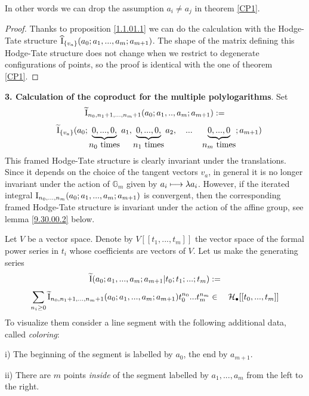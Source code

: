\documentclass[10pt]{article}
\begin{document}
In other words 
we can drop the assumption 
$a_i \not = a_j$ in theorem \ref{CP1}. 
  
\begin{proof}  Thanks to proposition \ref{1.1.01.1} we can do the calculation 
 with the Hodge-Tate structure $\widehat {\rm I}_{\{v_a\}}(a_0; a_1, ..., a_m; a_{m+1})$.
The shape of the matrix defining this Hodge-Tate structure 
does not change when we restrict to degenerate configurations of points, 
so the proof is identical with the one of theorem \ref{CP1}. 


\end{proof}

{\bf 3. Calculation of the coproduct for the multiple polylogarithms}. Set
\begin{equation}  \label{12.18.00.2}
\widetilde {\rm I}_{n_0, n_1+1, ..., n_m+1}(a_0; a_1, .., a_m; a_{m+1}):= 
\end{equation} 
$$
\quad \widetilde 
{\rm I}_{\{v_a\}}(a_0; \underbrace{0, ..., 0,}_{\mbox{$n_0$ times}} a_1, 
\underbrace{0, ..., 0,}_{\mbox{$n_1$ times}} a_2,\quad ...  \quad 
\underbrace{0, ..., 0}_{\mbox{$n_m$ times}}; a_{m+1})
 $$
This framed Hodge-Tate structure  is clearly invariant under the translations. Since it 
depends on the 
choice of the tangent vectors $v_a$, in general  it is 
no longer 
invariant under the 
action of ${\mathbb G}_m$ given by 
 $a_i \longmapsto \lambda a_i$. However, if the iterated integral 
${\rm I}_{n_0, ..., n_m}(a_0; a_1, ... , a_m ; a_{m+1})$ is convergent, then 
the corresponding framed Hodge-Tate structure is invariant under the 
action of the affine group, see lemma \ref{9.30.00.2} below. 


Let $V$ be a vector space. 
Denote by $V[[t_1, ..., t_m]]$ the vector space of the formal power 
series in $t_i$ whose coefficients are vectors of $V$. 
Let us make the generating series
\begin{equation} \label{CO1}
\widetilde {\rm I}(a_0; a_1, ... , a_m ; a_{m+1}| t_0; t_1; ... ; t_m) := 
\end{equation}
$$
\sum_{n_i \geq 0}\widetilde {\rm I}_{n_0, n_1+1, ..., n_m+1}(a_0; a_1, ... , a_m ; a_{m+1}) t_0^{n_0} ... t_m^{n_m} 
 \in \quad {\cal H}_{\bullet}[[ t_0, ..., t_m ]]
$$
To visualize them  
consider a line segment with the following additional data, called 
{\it coloring}:

i) The beginning of the segment is labelled by $a_0$, the end by $a_{m+1}$.

ii) There are $m$ points {\it inside} of the segment labelled by $a_1, ..., a_m$ from 
the left to the right. 
\end{document}
